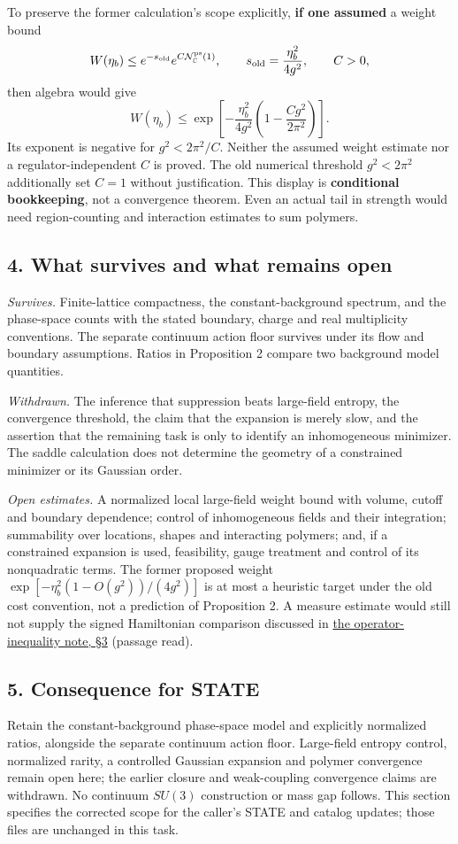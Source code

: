 \documentclass[11pt,a4paper]{article}
\begin{document}
To preserve the former calculation's scope explicitly, \textbf{if one
assumed} a weight bound
\[W(\eta_b)\le e^{-s_{\rm old}}e^{C\mathcal N_{\mathbb C}^{\rm ps}(1)},
\qquad s_{\rm old}=\frac{\eta_b^2}{4g^2},\qquad C>0,\] then algebra
would give \[W(\eta_b)\le
\exp\left[-\frac{\eta_b^2}{4g^2}
\left(1-\frac{Cg^2}{2\pi^2}\right)\right].\] Its exponent is negative
for \(g^2<2\pi^2/C\). Neither the assumed weight estimate nor a
regulator-independent \(C\) is proved. The old numerical threshold
\(g^2<2\pi^2\) additionally set \(C=1\) without justification. This
display is \textbf{conditional bookkeeping}, not a convergence theorem.
Even an actual tail in strength would need region-counting and
interaction estimates to sum polymers.

\subsection{4. What survives and what remains
open}\label{what-survives-and-what-remains-open}

\emph{Survives.} Finite-lattice compactness, the constant-background
spectrum, and the phase-space counts with the stated boundary, charge
and real multiplicity conventions. The separate continuum action floor
survives under its flow and boundary assumptions. Ratios in Proposition
2 compare two background model quantities.

\emph{Withdrawn.} The inference that suppression beats large-field
entropy, the convergence threshold, the claim that the expansion is
merely slow, and the assertion that the remaining task is only to
identify an inhomogeneous minimizer. The saddle calculation does not
determine the geometry of a constrained minimizer or its Gaussian order.

\emph{Open estimates.} A normalized local large-field weight bound with
volume, cutoff and boundary dependence; control of inhomogeneous fields
and their integration; summability over locations, shapes and
interacting polymers; and, if a constrained expansion is used,
feasibility, gauge treatment and control of its nonquadratic terms. The
former proposed weight \(\exp[-\eta_b^2(1-O(g^2))/(4g^2)]\) is at most a
heuristic target under the old cost convention, not a prediction of
Proposition 2. A measure estimate would still not supply the signed
Hamiltonian comparison discussed in
\href{large-field-operator-inequality.md\#3-the-sign-of-a-rare-perturbation}{the
operator-inequality note, §3} (passage read).

\subsection{5. Consequence for STATE}\label{consequence-for-state}

Retain the constant-background phase-space model and explicitly
normalized ratios, alongside the separate continuum action floor.
Large-field entropy control, normalized rarity, a controlled Gaussian
expansion and polymer convergence remain open here; the earlier closure
and weak-coupling convergence claims are withdrawn. No continuum
\(SU(3)\) construction or mass gap follows. This section specifies the
corrected scope for the caller's STATE and catalog updates; those files
are unchanged in this task.
\end{document}

